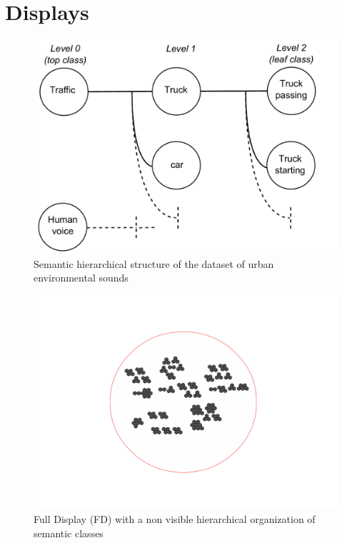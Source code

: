 \documentclass{aes2e}
\begin{document}

\section{Displays} \label{display}

\begin{figure}[t]
\begin{center}
\includegraphics[scale=0.24]{gfx/dataset.pdf} 
\end{center}
\caption{\label{figdataset} Semantic hierarchical structure of the dataset of urban environmental sounds}
\end{figure}




\begin{figure}[t!]
\begin{center}
\includegraphics[scale=0.30]{gfx/XP2clean.pdf} 
\end{center}
\caption{\label{figXP2} Full Display (FD) with a non visible hierarchical organization of semantic classes }
\end{figure}
\end{document}
